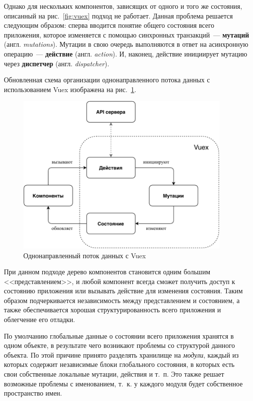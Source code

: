 Однако для нескольких компонентов, зависящих от одного и того же состояния, описанный на рис.~\ref{fig:vuex} подход не работает. Данная проблема решается следующим образом: сперва вводится понятие общего состояния всего приложения, которое изменяется с помощью синхронных транзакций~--- \textbf{мутаций} (англ. \textit{mutations}). Мутации в свою очередь выполняются в ответ на асинхронную операцию~--- \textbf{действие} (англ. \textit{action}). И, наконец, действие инициирует мутацию через \textbf{диспетчер} (англ. \textit{dispatcher}).

Обновленная схема организации однонаправленного потока данных с использованием Vuex изображена на рис.~\ref{fig:vuex2}.

\begin{figure}
	\centering
	\includegraphics[width=0.95\textwidth, keepaspectratio]{figures/vuex2}
	\caption{Однонаправленный поток данных с Vuex}
	\label{fig:vuex2}
\end{figure}

При данном подходе дерево компонентов становится одним большим <<представлением>>, и любой компонент всегда сможет получить доступ к состоянию приложения или вызывать действие для изменения состояния. Таким образом подчеркивается независимость между представлением и состоянием, а также обеспечивается хорошая структурированность всего приложения и облегчение его отладки.

По умолчанию глобальные данные о состоянии всего приложения хранятся в одном объекте, в результате чего возникают проблемы со структурой данного объекта. По этой причине принято разделять хранилище на \textit{модули}, каждый из которых содержит независимые блоки глобального состояния, в которых есть свои собственные локальные мутации, действия и т.~п. Это также решает возможные проблемы с именованием, т.~к. у каждого модуля будет собственное пространство имен.

